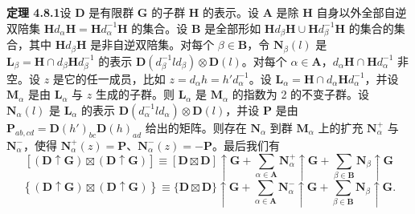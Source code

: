 \noindent\textbf{定理 4.8.1}\quad 设 $\mathbf{D}$ 是有限群 $\mathbf{G}$ 的子群 $\mathbf{H}$ 的表示。设 $\mathbf{A}$ 是除 $\mathbf{H}$ 自身以外全部自逆双陪集 $\mathbf{H}d_{\alpha}\mathbf{H} = \mathbf{H}d^{-1}_{\alpha}\mathbf{H}$ 的集合。设 $\mathbf{B}$ 是全部形如 $\mathbf{H}d_{\beta}\mathbf{H} \cup \mathbf{H}d^{-1}_{\beta}\mathbf{H}$ 的集合的集合，其中 $\mathbf{H}d_{\beta}\mathbf{H}$ 是非自逆双陪集。对每个 $\beta \in \mathbf{B}$，令 $\mathbf{N}_{\beta}(l)$ 是 $\mathbf{L}_{\beta} = \mathbf{H} \cap d_{\beta}\mathbf{H}d^{-1}_{\beta}$ 的表示 $\mathbf{D}(d^{-1}_{\beta}ld_{\beta}) \otimes \mathbf{D}(l)$。对每个 $\alpha \in \mathbf{A}$，$d_{\alpha}\mathbf{H} \cap \mathbf{H}d^{-1}_{\alpha}$ 非空。设 $z$ 是它的任一成员，比如 $z = d_{\alpha}h = h'd^{-1}_{\alpha}$。设 $\mathbf{L}_{\alpha} = \mathbf{H} \cap d_{\alpha}\mathbf{H}d^{-1}_{\alpha}$，并设 $\mathbf{M}_{\alpha}$ 是由 $\mathbf{L}_{\alpha}$ 与 $z$ 生成的子群。则 $\mathbf{L}_{\alpha}$ 是 $\mathbf{M}_{\alpha}$ 的指数为 2 的不变子群。设 $\mathbf{N}_{\alpha}(l)$ 是 $\mathbf{L}_{\alpha}$ 的表示 $\mathbf{D}(d^{-1}_{\alpha}ld_{\alpha}) \otimes \mathbf{D}(l)$，并设 $\mathbf{P}$ 是由 $\mathbf{P}_{ab, cd} = \mathbf{D}(h')_{bc}\mathbf{D}(h)_{ad}$ 给出的矩阵。则存在 $\mathbf{N}_{\alpha}$ 到群 $\mathbf{M}_{\alpha}$ 上的扩充 $\mathbf{N}^{+}_{\alpha}$ 与 $\mathbf{N}^{-}_{\alpha}$，使得 $\mathbf{N}^{+}_{\alpha}(z) = \mathbf{P}$、$\mathbf{N}^{-}_{\alpha}(z) = -\mathbf{P}$。最后我们有
\begin{equation*}
\left[(\mathbf{D} \uparrow \mathbf{G}) \boxtimes (\mathbf{D} \uparrow \mathbf{G})\right] \equiv [\mathbf{D} \boxtimes \mathbf{D}] \uparrow \mathbf{G} + \sum_{\alpha \in \mathbf{A}}\mathbf{N}^{+}_{\alpha} \uparrow \mathbf{G} + \sum_{\beta \in \mathbf{B}}\mathbf{N}_{\beta} \uparrow \mathbf{G}
\tag{4.8.34}
\end{equation*}
\begin{equation*}
\left\{(\mathbf{D} \uparrow \mathbf{G}) \boxtimes (\mathbf{D} \uparrow \mathbf{G})\right\} \equiv \{\mathbf{D} \boxtimes \mathbf{D}\} \uparrow \mathbf{G} + \sum_{\alpha \in \mathbf{A}}\mathbf{N}^{-}_{\alpha} \uparrow \mathbf{G} + \sum_{\beta \in \mathbf{B}}\mathbf{N}_{\beta} \uparrow \mathbf{G}.
\tag{4.8.35}
\end{equation*}

